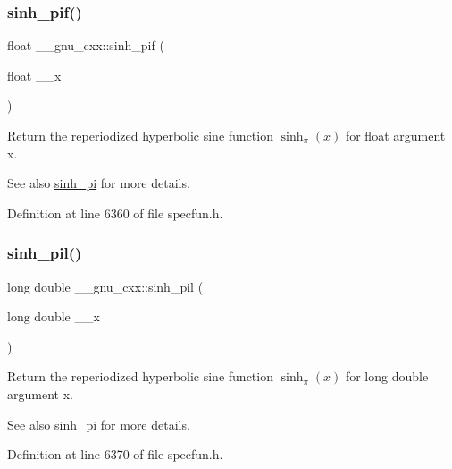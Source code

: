 \subsubsection{\texorpdfstring{sinh\+\_\+pif()}{sinh\_pif()}}
{\footnotesize\ttfamily float \+\_\+\+\_\+gnu\+\_\+cxx\+::sinh\+\_\+pif (\begin{DoxyParamCaption}\item[{float}]{\+\_\+\+\_\+x }\end{DoxyParamCaption})\hspace{0.3cm}{\ttfamily [inline]}}

Return the reperiodized hyperbolic sine function $ \sinh_\pi(x) $ for {\ttfamily float} argument {\ttfamily x}.

\begin{DoxySeeAlso}{See also}
\hyperlink{group__mathsf__gnu_gade43453b87b6b38c05b3fcce40870542}{sinh\+\_\+pi} for more details. 
\end{DoxySeeAlso}


Definition at line 6360 of file specfun.\+h.

\mbox{\label{group__mathsf__gnu_ga2232ee554ef2a902824db42e2e09c483}} 
\subsubsection{\texorpdfstring{sinh\+\_\+pil()}{sinh\_pil()}}
{\footnotesize\ttfamily long double \+\_\+\+\_\+gnu\+\_\+cxx\+::sinh\+\_\+pil (\begin{DoxyParamCaption}\item[{long double}]{\+\_\+\+\_\+x }\end{DoxyParamCaption})\hspace{0.3cm}{\ttfamily [inline]}}

Return the reperiodized hyperbolic sine function $ \sinh_\pi(x) $ for {\ttfamily long double} argument {\ttfamily x}.

\begin{DoxySeeAlso}{See also}
\hyperlink{group__mathsf__gnu_gade43453b87b6b38c05b3fcce40870542}{sinh\+\_\+pi} for more details. 
\end{DoxySeeAlso}


Definition at line 6370 of file specfun.\+h.

